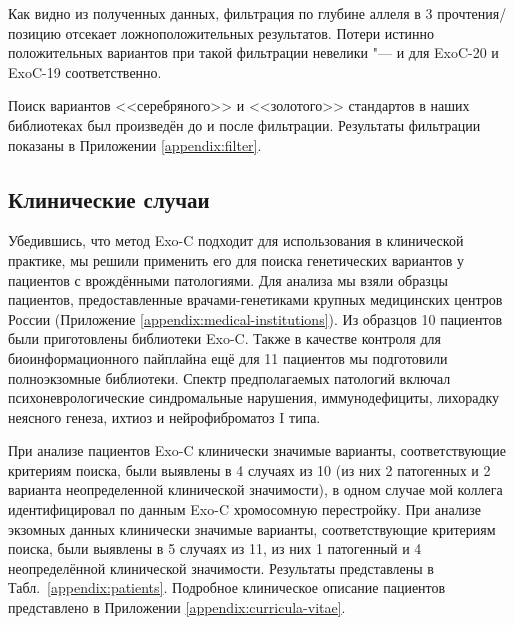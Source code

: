 \documentclass[a4paper,14pt]{extarticle}
\newcommand{\tableref}[1]{Табл.~\ref{#1}}
\begin{document}
Как видно из полученных данных, фильтрация по глубине аллеля в 3 прочтения/позицию отсекает  ложноположительных результатов.
Потери истинно положительных вариантов при такой фильтрации невелики "---  и  для ExoC-20 и ExoC-19 соответственно.

Поиск вариантов <<серебряного>> и <<золотого>> стандартов в наших библиотеках был произведён до и после фильтрации.
Результаты фильтрации показаны в Приложении \ref{appendix:filter}.

\subsection{Клинические случаи}

Убедившись, что метод Exo-C подходит для использования в клинической практике, мы решили применить его для поиска генетических вариантов у пациентов с врождёнными патологиями.
Для анализа мы взяли образцы пациентов, предоставленные врачами-генетиками крупных медицинских центров России (Приложение \ref{appendix:medical-institutions}).
Из образцов 10 пациентов были приготовлены библиотеки Exo-C.
Также в качестве контроля для биоинформационного пайплайна ещё для 11 пациентов мы подготовили полноэкзомные библиотеки.
Спектр предполагаемых патологий включал психоневрологические синдромальные нарушения, иммунодефициты, лихорадку неясного генеза, ихтиоз и нейрофиброматоз I типа.

При анализе пациентов Exo-C клинически значимые варианты, соответствующие критериям поиска, были выявлены в 4 случаях из 10 (из них 2 патогенных и 2 варианта неопределенной клинической значимости), в одном случае мой коллега идентифицировал по данным Exo-C хромосомную перестройку. При анализе экзомных данных клинически значимые варианты, соответствующие критериям поиска, были выявлены в 5 случаях из 11, из них 1 патогенный и 4 неопределённой клинической значимости.
Результаты представлены в \tableref{appendix:patients}.
Подробное клиническое описание пациентов представлено в Приложении \ref{appendix:curricula-vitae}.
\end{document}
